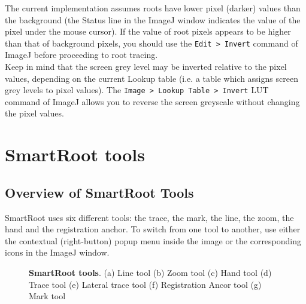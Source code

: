 \documentclass[a4paper,english,10pt]{report}
\begin{document}
The current implementation assumes roots have lower pixel (darker) values than the background (the Status line in the ImageJ window indicates the value of the pixel under the mouse cursor). If the value of root pixels appears to be higher than that of background pixels, you should use the \verb|Edit > Invert| command of ImageJ before proceeding to root tracing.\\

Keep in mind that the screen grey level may be inverted relative to the pixel values, depending on the current Lookup table (i.e. a table which assigns screen grey levels to pixel values). The \verb|Image > Lookup Table > Invert| LUT command of ImageJ allows you to reverse the screen greyscale without changing the pixel values.


\chapter{SmartRoot tools}

{\color{coolSection}\section{Overview of SmartRoot Tools}}

SmartRoot uses six different tools: the trace, the mark, the line, the zoom, the hand and the registration anchor. To switch from one tool to another, use either the contextual (right-button) popup menu inside the image or the corresponding icons in the ImageJ window.

\begin{figure}[h]
\centering
  \hspace{5mm}   
  \hspace{5mm}   
  \hspace{5mm}   
  \hspace{5mm}  
  \hspace{5mm}      
  \hspace{5mm}   
  \hspace{5mm}  
  
\caption[SmartRoot tools]{\textbf{SmartRoot tools}. (a) Line tool (b) Zoom tool (c) Hand tool (d) Trace tool (e) Lateral trace tool (f) Registration Ancor tool (g) Mark tool }
\label{apoplastique}
\end{figure}
\end{document}
